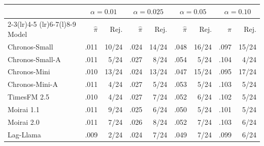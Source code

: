 \begin{tabular}{@{}l rr rr rr rr@{}}
\toprule
& \multicolumn{2}{c}{$\alpha=0.01$}
& \multicolumn{2}{c}{$\alpha=0.025$}
& \multicolumn{2}{c}{$\alpha=0.05$}
& \multicolumn{2}{c}{$\alpha=0.10$} \\
\cmidrule(lr){2-3}\cmidrule(lr){4-5}
\cmidrule(lr){6-7}\cmidrule(l){8-9}
Model & $\hat\pi$ & Rej.
& $\hat\pi$ & Rej.
& $\hat\pi$ & Rej.
& $\hat\pi$ & Rej. \\
\midrule
Chronos-Small & .011 & 10/24
& .024 & 14/24
& .048 & 16/24
& .097 & 15/24 \\
Chronos-Small-A & .011 & 5/24
& .027 & 8/24
& .054 & 5/24
& .104 & 4/24 \\
Chronos-Mini & .010 & 13/24
& .024 & 13/24
& .047 & 15/24
& .095 & 17/24 \\
Chronos-Mini-A & .011 & 4/24
& .027 & 5/24
& .053 & 5/24
& .103 & 5/24 \\
TimesFM 2.5 & .010 & 4/24
& .027 & 7/24
& .052 & 6/24
& .102 & 5/24 \\
Moirai 1.1 & .011 & 9/24
& .025 & 6/24
& .050 & 5/24
& .101 & 5/24 \\
Moirai 2.0 & .011 & 7/24
& .026 & 8/24
& .052 & 7/24
& .103 & 6/24 \\
Lag-Llama & .009 & 2/24
& .024 & 7/24
& .049 & 7/24
& .099 & 6/24 \\
\bottomrule
\end{tabular}
